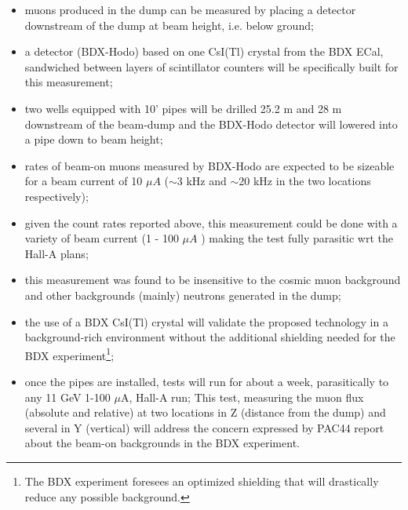 \begin{itemize}
\item{muons produced in the dump can be measured by placing a  detector downstream of the dump at beam height, i.e. below ground;}
\item{a detector  (BDX-Hodo) based on one CsI(Tl) crystal from  the BDX ECal, sandwiched between layers of scintillator counters  will be specifically built for this measurement;}
\item{ two wells equipped with 10' pipes will be drilled  25.2 m and 28 m downstream of the beam-dump and the BDX-Hodo detector will lowered into a pipe down to beam height;}
\item{rates of beam-on muons measured by BDX-Hodo are expected  to be sizeable for  a beam current of 10 $\mu A$ ($\sim$3 kHz and $\sim$20 kHz in the two locations respectively);}
\item{given the count rates reported above, this measurement could be done  with a variety of beam current (1 - 100 $\mu A$ ) making the test fully parasitic wrt the Hall-A plans;}
\item{this measurement was found to be insensitive to the cosmic muon background and other backgrounds (mainly) neutrons generated in the dump; }
\item{the use of a BDX CsI(Tl) crystal will validate the proposed technology in a background-rich environment without the additional shielding needed for the BDX experiment\footnote{The BDX experiment foresees  an optimized shielding that will drastically reduce  any possible background.}; }
\item{once the pipes are installed, tests will run for about a week, parasitically  to  any 11 GeV 1-100 $\mu$A, Hall-A run;} 
This  test, measuring the muon flux (absolute and relative) at two locations in Z (distance from the dump) and several in Y (vertical) will address the concern expressed by PAC44 report about the beam-on backgrounds in the BDX experiment.
\end{itemize}

